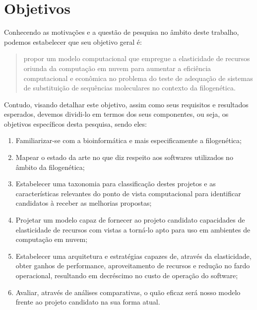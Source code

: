 \documentclass[english,brazilian]{UNISINOSmonografia} %
\begin{document}
\section{Objetivos}
\label{sec:objetivos}



Conhecendo as motivações e a questão de pesquisa no âmbito deste trabalho, podemos estabelecer que seu objetivo geral é:
\begin{quote}
	\large
	propor um modelo computacional que empregue a elasticidade de recursos oriunda da computação em nuvem para aumentar a eficiência computacional e econômica no problema do teste de adequação de sistemas de substituição de sequências moleculares no contexto da filogenética.
\end{quote}
Contudo, visando detalhar este objetivo, assim como seus requisitos e resultados esperados, devemos dividi-lo em termos dos seus componentes, ou seja, os objetivos específicos desta pesquisa, sendo eles:


\begin{enumerate}[label=Objetivo~\arabic*:~,itemindent=*]
	
	\item Familiarizar-se com a bioinformática e mais especificamente a filogenética;
	
	\item Mapear o estado da arte no que diz respeito aos softwares utilizados no âmbito da filogenética;
	
	\item Estabelecer uma taxonomia para classificação destes projetos e as características relevantes do ponto de vista computacional para identificar candidatos à receber as melhorias propostas;
	
	\item Projetar um modelo capaz de fornecer ao projeto candidato capacidades de elasticidade de recursos com vistas a torná-lo apto para uso em ambientes de computação em nuvem;
	
	\item Estabelecer uma arquitetura e estratégias capazes de, através da elasticidade, obter ganhos de performance, aproveitamento de recursos e redução no fardo operacional, resultando em decréscimo no custo de operação do software;
	
	\item Avaliar, através de análises comparativas, o quão eficaz será nosso modelo frente ao projeto candidato na sua forma atual.
	
\end{enumerate}
\end{document}
